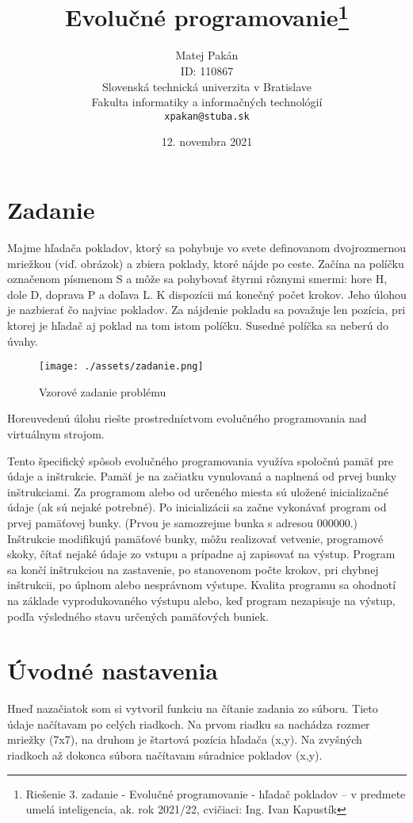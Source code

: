 \documentclass[10pt,oneside,slovak,a4paper]{article}
\title{Evolučné programovanie\thanks{Riešenie 3. zadanie - Evolučné programovanie - hľadač pokladov – v predmete umelá inteligencia, ak. rok 2021/22, cvičiaci: 
Ing. Ivan Kapustík}}
\author{Matej Pakán\\[2pt]
	{\small ID: 110867}\\
	{\small Slovenská technická univerzita v Bratislave}\\
	{\small Fakulta informatiky a informačných technológií}\\
	{\small \texttt{xpakan@stuba.sk}}
	}
\date{\small 12. novembra 2021}
\begin{document}
\maketitle
\newpage
\tableofcontents{\protect\newpage}

\section{Zadanie}

Majme hľadača pokladov, ktorý sa pohybuje vo svete definovanom dvojrozmernou mriežkou (viď. obrázok) a zbiera poklady, ktoré nájde po ceste. Začína na políčku označenom písmenom S a môže sa pohybovať štyrmi rôznymi smermi: hore H, dole D, doprava P a doľava L. K dispozícii má konečný počet krokov. Jeho úlohou je nazbierať čo najviac pokladov. Za nájdenie pokladu sa považuje len pozícia, pri ktorej je hľadač aj poklad na tom istom políčku. Susedné políčka sa neberú do úvahy.

\begin{figure}[h]
\centerline{\texttt{[image: ./assets/zadanie.png]}} 
\caption{Vzorové zadanie problému}
\end{figure}

Horeuvedenú úlohu riešte prostredníctvom evolučného programovania nad virtuálnym strojom.

Tento špecifický spôsob evolučného programovania využíva spoločnú pamäť pre údaje a inštrukcie. Pamäť je na začiatku vynulovaná a naplnená od prvej bunky inštrukciami. Za programom alebo od určeného miesta sú uložené inicializačné údaje (ak sú nejaké potrebné). Po inicializácii sa začne vykonávať program od prvej pamäťovej bunky. (Prvou je samozrejme bunka s adresou 000000.) Inštrukcie modifikujú pamäťové bunky, môžu realizovať vetvenie, programové skoky, čítať nejaké údaje zo vstupu a prípadne aj zapisovať na výstup. Program sa končí inštrukciou na zastavenie, po stanovenom počte krokov, pri chybnej inštrukcii, po úplnom alebo nesprávnom výstupe. Kvalita programu sa ohodnotí na základe vyprodukovaného výstupu alebo, keď program nezapisuje na výstup, podľa výsledného stavu určených pamäťových buniek.

\section{Úvodné nastavenia}

Hneď nazačiatok som si vytvoril funkciu na čítanie zadania zo súboru. Tieto údaje načítavam po celých riadkoch.
Na prvom riadku sa nachádza rozmer mriežky (7x7), na druhom je štartová pozícia hľadača (x,y).
Na zvyšných riadkoch až dokonca súbora načítavam súradnice pokladov (x,y).
\end{document}
